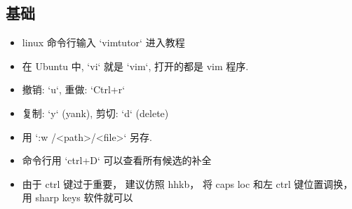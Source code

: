 
\begin{issues}
\issueDraft
\end{issues}




\subsection{基础}
\begin{itemize}
\item linux 命令行输入 `vimtutor` 进入教程
\item 在 Ubuntu 中, `vi` 就是 `vim`, 打开的都是 vim 程序.
\item 撤销: `u`, 重做: `Ctrl+r`
\item 复制: `y` (yank), 剪切: `d` (delete)
\item 用 `:w /<path>/<file>` 另存.
\item 命令行用 `ctrl+D` 可以查看所有候选的补全
\item 由于 ctrl 键过于重要， 建议仿照 hhkb， 将 caps loc 和左 ctrl 键位置调换， 用 sharp keys 软件就可以 
\end{itemize}

